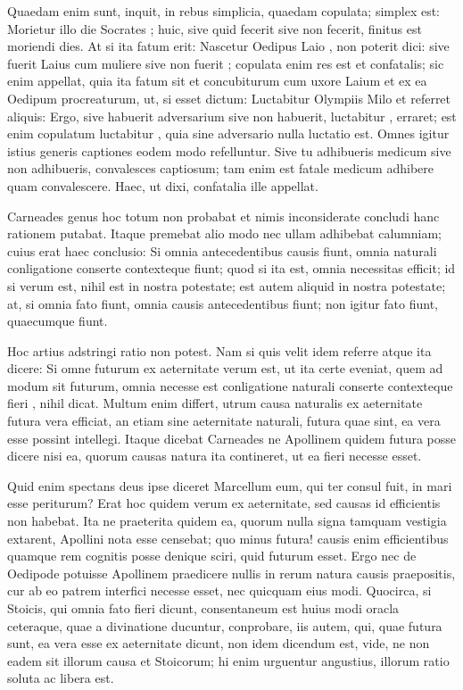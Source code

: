  Quaedam enim sunt, inquit, in rebus simplicia, quaedam copulata; simplex est: Morietur illo die Socrates ; huic, sive quid fecerit sive non fecerit, finitus est moriendi dies. At si ita fatum erit: Nascetur Oedipus Laio , non poterit dici: sive fuerit Laius cum muliere sive non fuerit ; copulata enim res est et confatalis; sic enim appellat, quia ita fatum sit et concubiturum cum uxore Laium et ex ea Oedipum procreaturum, ut, si esset dictum: Luctabitur Olympiis Milo et referret aliquis: Ergo, sive habuerit adversarium sive non habuerit, luctabitur , erraret; est enim copulatum luctabitur , quia sine adversario nulla luctatio est. Omnes igitur istius generis captiones eodem modo refelluntur. Sive tu adhibueris medicum sive non adhibueris, convalesces captiosum; tam enim est fatale medicum adhibere quam convalescere. Haec, ut dixi, confatalia ille appellat.

 Carneades genus hoc totum non probabat et nimis inconsiderate concludi hanc rationem putabat. Itaque premebat alio modo nec ullam adhibebat calumniam; cuius erat haec conclusio: Si omnia antecedentibus causis fiunt, omnia naturali conligatione conserte contexteque fiunt; quod si ita est, omnia necessitas efficit; id si verum est, nihil est in nostra potestate; est autem aliquid in nostra potestate; at, si omnia fato fiunt, omnia causis antecedentibus fiunt; non igitur fato fiunt, quaecumque fiunt.

 Hoc artius adstringi ratio non potest. Nam si quis velit idem referre atque ita dicere: Si omne futurum ex aeternitate verum est, ut ita certe eveniat, quem ad modum sit futurum, omnia necesse est conligatione naturali conserte contexteque fieri , nihil dicat. Multum enim differt, utrum causa naturalis ex aeternitate futura vera efficiat, an etiam sine aeternitate naturali, futura quae sint, ea vera esse possint intellegi. Itaque dicebat Carneades ne Apollinem quidem futura posse dicere nisi ea, quorum causas natura ita contineret, ut ea fieri necesse esset.

 Quid enim spectans deus ipse diceret Marcellum eum, qui ter consul fuit, in mari esse periturum? Erat hoc quidem verum ex aeternitate, sed causas id efficientis non habebat. Ita ne praeterita quidem ea, quorum nulla signa tamquam vestigia extarent, Apollini nota esse censebat; quo minus futura! causis enim efficientibus quamque rem cognitis posse denique sciri, quid futurum esset. Ergo nec de Oedipode potuisse Apollinem praedicere nullis in rerum natura causis praepositis, cur ab eo patrem interfici necesse esset, nec quicquam eius modi. Quocirca, si Stoicis, qui omnia fato fieri dicunt, consentaneum est huius modi oracla ceteraque, quae a divinatione ducuntur, conprobare, iis autem, qui, quae futura sunt, ea vera esse ex aeternitate dicunt, non idem dicendum est, vide, ne non eadem sit illorum causa et Stoicorum; hi enim urguentur angustius, illorum ratio soluta ac libera est.

